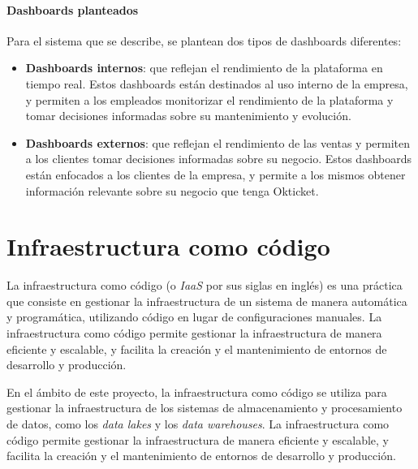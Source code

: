 \newpage{}
\paragraph{Dashboards planteados}
Para el sistema que se describe, se plantean dos tipos de dashboards diferentes:

\begin{itemize}
	\item \textbf{Dashboards internos}: que reflejan el rendimiento de la plataforma en tiempo real.
		Estos dashboards están destinados al uso interno de la empresa, y permiten a los
		empleados monitorizar el rendimiento de la plataforma y tomar decisiones informadas
		sobre su mantenimiento y evolución.
	\item \textbf{Dashboards externos}: que reflejan el rendimiento de las ventas y permiten a los
	    clientes tomar decisiones informadas sobre su negocio. Estos dashboards están enfocados
		a los clientes de la empresa, y permite a los mismos obtener información relevante sobre
		su negocio que tenga Okticket.
\end{itemize}


\section{Infraestructura como código}
La infraestructura como código (o \textit{IaaS} por sus siglas en inglés) es una práctica que consiste
en gestionar la infraestructura de un sistema de manera automática y programática, utilizando código
en lugar de configuraciones manuales. La infraestructura como código permite gestionar la infraestructura
de manera eficiente y escalable, y facilita la creación y el mantenimiento de entornos de desarrollo y
producción.

En el ámbito de este proyecto, la infraestructura como código se utiliza para gestionar la infraestructura
de los sistemas de almacenamiento y procesamiento de datos, como los \textit{data lakes} y los \textit{data
warehouses}. La infraestructura como código permite gestionar la infraestructura de manera eficiente y
escalable, y facilita la creación y el mantenimiento de entornos de desarrollo y producción.



